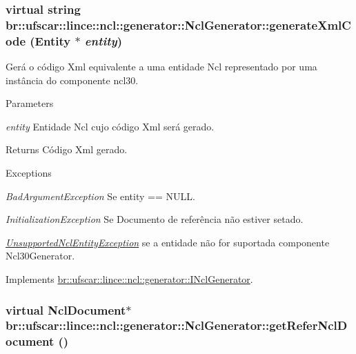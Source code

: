 \hypertarget{classbr_1_1ufscar_1_1lince_1_1ncl_1_1generator_1_1NclGenerator_a59b182d92c713dce65071b9a9c391c5f}{
\subsubsection[{generateXmlCode}]{\setlength{\rightskip}{0pt plus 5cm}virtual string br::ufscar::lince::ncl::generator::NclGenerator::generateXmlCode (Entity $\ast$ {\em entity})}}
\label{classbr_1_1ufscar_1_1lince_1_1ncl_1_1generator_1_1NclGenerator_a59b182d92c713dce65071b9a9c391c5f}


Gerá o código Xml equivalente a uma entidade Ncl representado por uma instância do componente ncl30. 


\begin{DoxyParams}{Parameters}
\item[{\em entity}]Entidade Ncl cujo código Xml será gerado. \end{DoxyParams}
\begin{DoxyReturn}{Returns}
Código Xml gerado. 
\end{DoxyReturn}

\begin{DoxyExceptions}{Exceptions}
\item[{\em BadArgumentException}]Se entity == NULL. \item[{\em InitializationException}]Se Documento de referência não estiver setado. \item[{\em \hyperlink{classbr_1_1ufscar_1_1lince_1_1ncl_1_1generator_1_1UnsupportedNclEntityException}{UnsupportedNclEntityException}}]se a entidade não for suportada componente Ncl30Generator. \end{DoxyExceptions}


Implements \hyperlink{classbr_1_1ufscar_1_1lince_1_1ncl_1_1generator_1_1INclGenerator_ab15f1ff3a96439e2a33427c7df5d9988}{br::ufscar::lince::ncl::generator::INclGenerator}.

\hypertarget{classbr_1_1ufscar_1_1lince_1_1ncl_1_1generator_1_1NclGenerator_ab8447127e8b36e07f83995e4a0867596}{
\subsubsection[{getReferNclDocument}]{\setlength{\rightskip}{0pt plus 5cm}virtual NclDocument$\ast$ br::ufscar::lince::ncl::generator::NclGenerator::getReferNclDocument ()}}
\label{classbr_1_1ufscar_1_1lince_1_1ncl_1_1generator_1_1NclGenerator_ab8447127e8b36e07f83995e4a0867596}


